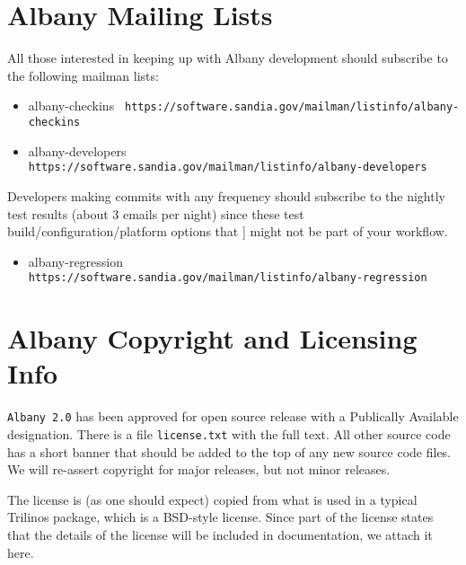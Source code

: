 \documentclass[pdf,12pt,report,strict]{SANDreport}
\theoremstyle{remark}
\begin{document}
\chapter{Albany Mailing Lists}
All those interested in keeping up with Albany development should subscribe
to the following mailman lists:
\begin{itemize}
\item albany-checkins  \texttt{ https://software.sandia.gov/mailman/listinfo/albany-checkins}
\item albany-developers  \texttt{ https://software.sandia.gov/mailman/listinfo/albany-developers}
\end{itemize}
Developers making commits with any frequency should subscribe to the nightly test results
(about 3 emails per night) since these test build/configuration/platform options that ]
might not be part of your workflow.
\begin{itemize}
\item albany-regression  \texttt{ https://software.sandia.gov/mailman/listinfo/albany-regression}
\end{itemize}


\chapter{Albany Copyright and Licensing Info}

\texttt{Albany 2.0} has been approved for open source release with a
Publically Available designation. There is a file \texttt{license.txt} 
with the full text. All other source code has a short banner that should
be added to the top of any new source code files. We will re-assert 
copyright for major releases, but not minor releases. 

The license is (as one should expect) copied from what is used in a
typical Trilinos package, which is a BSD-style license. 
Since part of the license states that the details of the license 
will be included in documentation, we attach it here.
\end{document}
